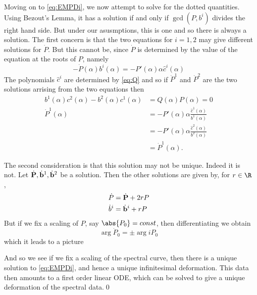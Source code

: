 \documentclass{article}
\begin{document}
Moving on to \eqref{eq:EMPDi}, we now attempt to solve for the dotted quantities. Using Bezout's Lemma, it has a solution if and only if $\gcd(P,b^i)$ divides the right hand side. But under our asusmptions, this is one and so there is always a solution. The first concern is that the two equations for $i=1,2$ may give different solutions for $\dot P$. But this cannot be, since $\dot P$ is determined by the value of the equation at the roots of $P$, namely
\[
-\dot P(\alpha) b^i(\alpha) = -P'(\alpha)\alpha\hat c^i(\alpha)
\]
The polynomials $\hat c^i$ are determined by \eqref{eq:Q} and so if $\dot P^1$ and $\dot P^2$ are the two solutions arrising from the two equations then
\begin{align*}
b^1(\alpha) c^2(\alpha) - b^2(\alpha) c^1(\alpha) &= Q(\alpha) P(\alpha) = 0 \\
\dot P^1(\alpha)
&= -P'(\alpha)\alpha \frac{\hat c^1(\alpha)}{b^1(\alpha)} \\
&= -P'(\alpha)\alpha \frac{\hat c^2(\alpha)}{b^2(\alpha)} \\
&= \dot P^1(\alpha).
\end{align*}

The second consideration is that this solution may not be unique. Indeed it is not. Let $\dot {\bf P}, \dot {\bf b}^1, \dot {\bf b}^2$ be a solution. Then the other solutions are given by, for $r\in \R$,
\begin{align*}
\dot P &= \dot {\bf P} + 2rP \\
\dot b^i &= \dot {\bf b}^i + rP \\
\end{align*}
But if we fix a scaling of $P$, say $\abs{P_0} = const$, then differentiating we obtain
\[
\arg \dot P_0 = \pm \arg i P_0
\]
which it leads to a picture

\begin{center}
\end{center}
And so we see if we fix a scaling of the spectral curve, then there is a unique solution to \eqref{eq:EMPDi}, and hence a unique infinitesimal deformation. This data then amounts to a first order linear ODE, which can be solved to give a unique deformation of the spectral data.\qed
\end{document}
